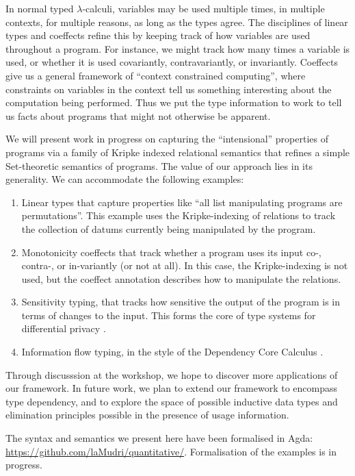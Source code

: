 In normal typed $\lambda$-calculi, variables may be used multiple
times, in multiple contexts, for multiple reasons, as long as the
types agree. The disciplines of linear types \cite{girard87linear} and
coeffects \cite{PetricekOM14,BrunelGMZ14,GhicaS14} refine this by
keeping track of how variables are used throughout a program. For
instance, we might track how many times a variable is used, or whether
it is used covariantly, contravariantly, or invariantly. Coeffects
give us a general framework of ``context constrained computing'',
where constraints on variables in the context tell us something
interesting about the computation being performed. Thus we put the
type information to work to tell us facts about programs that might
not otherwise be apparent.

We will present work in progress on capturing the ``intensional''
properties of programs via a family of Kripke indexed relational
semantics that refines a simple Set-theoretic semantics of
programs. The value of our approach lies in its generality. We can
accommodate the following examples:
\begin{enumerate}
\item Linear types that capture properties like ``all list
  manipulating programs are permutations''. This example uses the
  Kripke-indexing of relations to track the collection of datums
  currently being manipulated by the program.
\item Monotonicity coeffects that track whether a program uses its
  input co-, contra-, or in-variantly (or not at all). In this case,
  the Kripke-indexing is not used, but the coeffect annotation
  describes how to manipulate the relations.
\item Sensitivity typing, that tracks how sensitive the output of the
  program is in terms of changes to the input. This forms the core of
  type systems for differential privacy \cite{reed10distance}.
\item Information flow typing, in the style of the Dependency Core
  Calculus \cite{abadi99core}.
\end{enumerate}
Through discusssion at the workshop, we hope to discover more
applications of our framework. In future work, we plan to extend our
framework to encompass type dependency, and to explore the space of
possible inductive data types and elimination principles possible in
the presence of usage information.

The syntax and semantics we present here have been formalised in Agda:
\url{https://github.com/laMudri/quantitative/}. Formalisation of the
examples is in progress.

